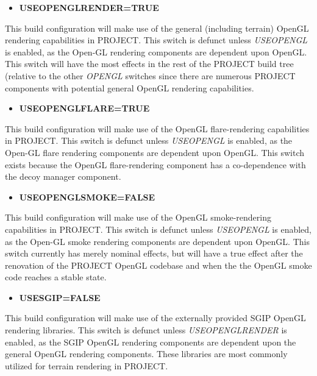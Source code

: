 \documentclass[12pt,letterpaper]{article}
\begin{document}
\begin{itemize}
\item \textbf{USEOPENGLRENDER=TRUE}
\end{itemize}

This build configuration will make use of the general (including terrain) OpenGL rendering capabilities in PROJECT.  This switch is defunct unless \emph{USEOPENGL} is enabled, as the Open-GL rendering components are dependent upon OpenGL.  This switch will have the most effects in the rest of the PROJECT build tree (relative to the other \emph{OPENGL} switches since there are numerous PROJECT components with potential general OpenGL rendering capabilities.

\begin{itemize}
\item \textbf{USEOPENGLFLARE=TRUE}
\end{itemize}

This build configuration will make use of the OpenGL flare-rendering capabilities in PROJECT.  This switch is defunct unless \emph{USEOPENGL} is enabled, as the Open-GL flare rendering components are dependent upon OpenGL.  This switch exists because the OpenGL flare-rendering component has a co-dependence with the decoy manager component.

\begin{itemize}
\item \textbf{USEOPENGLSMOKE=FALSE}
\end{itemize}

This build configuration will make use of the OpenGL smoke-rendering capabilities in PROJECT.  This switch is defunct unless \emph{USEOPENGL} is enabled, as the Open-GL smoke rendering components are dependent upon OpenGL.  This switch currently has merely nominal effects, but will have a true effect after the renovation of the PROJECT OpenGL codebase and when the the OpenGL smoke code reaches a stable state.

\begin{itemize}
\item \textbf{USESGIP=FALSE}
\end{itemize}

This build configuration will make use of the externally provided SGIP OpenGL rendering libraries.  This switch is defunct unless \emph{USEOPENGLRENDER} is enabled, as the SGIP OpenGL rendering components are dependent upon the general OpenGL rendering components.  These libraries are most commonly utilized for terrain rendering in PROJECT.
\end{document}

